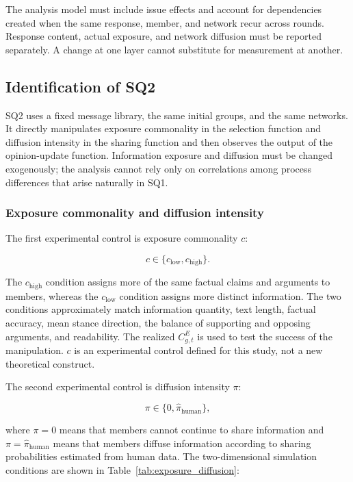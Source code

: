 \documentclass[11pt,a4paper]{article}
\begin{document}
The analysis model must include issue effects and account for dependencies created when the same response, member, and network recur across rounds. Response content, actual exposure, and network diffusion must be reported separately. A change at one layer cannot substitute for measurement at another.

\subsection{Identification of SQ2}

SQ2 uses a fixed message library, the same initial groups, and the same networks. It directly manipulates exposure commonality in the selection function and diffusion intensity in the sharing function and then observes the output of the opinion-update function. Information exposure and diffusion must be changed exogenously; the analysis cannot rely only on correlations among process differences that arise naturally in SQ1.

\subsubsection{Exposure commonality and diffusion intensity}

The first experimental control is exposure commonality $c$:

\begin{equation*}
c\in\{c_{\text{low}},c_{\text{high}}\}.
\end{equation*}

The $c_{\text{high}}$ condition assigns more of the same factual claims and arguments to members, whereas the $c_{\text{low}}$ condition assigns more distinct information. The two conditions approximately match information quantity, text length, factual accuracy, mean stance direction, the balance of supporting and opposing arguments, and readability. The realized $C^{E}_{g,t}$ is used to test the success of the manipulation. $c$ is an experimental control defined for this study, not a new theoretical construct.

The second experimental control is diffusion intensity $\pi$:

\begin{equation*}
\pi\in\{0,\hat\pi_{\text{human}}\},
\end{equation*}

where $\pi=0$ means that members cannot continue to share information and $\pi=\hat\pi_{\text{human}}$ means that members diffuse information according to sharing probabilities estimated from human data. The two-dimensional simulation conditions are shown in Table~\ref{tab:exposure_diffusion}:
\end{document}
